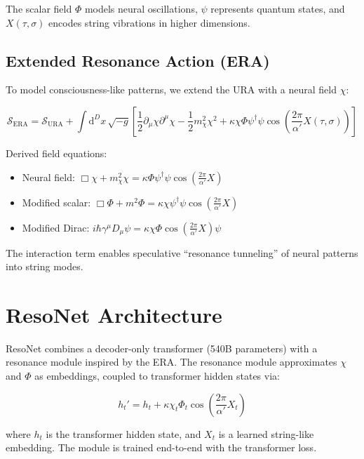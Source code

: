 \documentclass{article}
\begin{document}
The scalar field \(\Phi\) models neural oscillations, \(\psi\) represents quantum states, and \(X(\tau,\sigma)\) encodes string vibrations in higher dimensions.

\subsection{Extended Resonance Action (ERA)}
To model consciousness-like patterns, we extend the URA with a neural field \(\chi\):

\begin{equation}
\mathcal{S}_{\text{ERA}} = \mathcal{S}_{\text{URA}} + \int \mathrm{d}^D x \, \sqrt{-g} \left[ \frac{1}{2} \partial_\mu \chi \partial^\mu \chi - \frac{1}{2} m_\chi^2 \chi^2 + \kappa \chi \Phi \psi^\dagger \psi \cos\left( \frac{2\pi}{\alpha'} X(\tau,\sigma) \right) \right]
\label{eq:ERA}
\end{equation}

Derived field equations:
\begin{itemize}
    \item Neural field: \(\Box \chi + m_\chi^2 \chi = \kappa \Phi \psi^\dagger \psi \cos\left( \frac{2\pi}{\alpha'} X \right)\)
    \item Modified scalar: \(\Box \Phi + m^2 \Phi = \kappa \chi \psi^\dagger \psi \cos\left( \frac{2\pi}{\alpha'} X \right)\)
    \item Modified Dirac: \(i\hbar \gamma^\mu D_\mu \psi = \kappa \chi \Phi \cos\left( \frac{2\pi}{\alpha'} X \right) \psi\)
\end{itemize}

The interaction term enables speculative “resonance tunneling” of neural patterns into string modes.

\section{ResoNet Architecture}
ResoNet combines a decoder-only transformer (540B parameters) with a resonance module inspired by the ERA. The resonance module approximates \(\chi\) and \(\Phi\) as embeddings, coupled to transformer hidden states via:

\begin{equation}
h_t' = h_t + \kappa \chi_t \Phi_t \cos\left( \frac{2\pi}{\alpha'} X_t \right)
\label{eq:resonance_module}
\end{equation}

where \(h_t\) is the transformer hidden state, and \(X_t\) is a learned string-like embedding. The module is trained end-to-end with the transformer loss.
\end{document}
